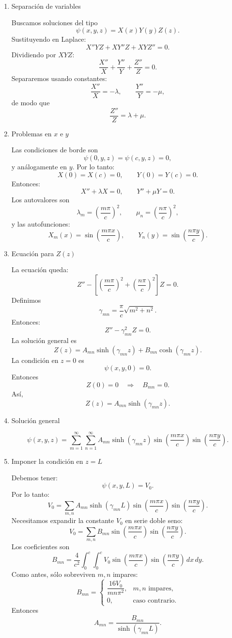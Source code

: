 \documentclass[11pt,spanish]{article}
\begin{document}
\begin{enumerate}
\item Separación de variables

Buscamos soluciones del tipo
$$
\psi(x,y,z)=X(x)Y(y)Z(z).
$$
Sustituyendo en Laplace:
$$
X''YZ+XY''Z+XYZ''=0.
$$
Dividiendo por $XYZ$:
$$
\frac{X''}{X}
+
\frac{Y''}{Y}
+
\frac{Z''}{Z}
=0.
$$
Separaremos usando constantes:
$$
\frac{X''}{X}=-\lambda,
\qquad
\frac{Y''}{Y}=-\mu,
$$
de modo que
$$
\frac{Z''}{Z}=\lambda+\mu.
$$

\item Problemas en $x$ e $y$

Las condiciones de borde son
$$
\psi(0,y,z)=\psi(c,y,z)=0,
$$
y análogamente en $y$. Por lo tanto:
$$
X(0)=X(c)=0,
\qquad
Y(0)=Y(c)=0.
$$
Entonces:
$$
X''+\lambda X=0,
\qquad
Y''+\mu Y=0.
$$
Los autovalores son
$$
\lambda_m=\left(\frac{m\pi}{c}\right)^2,
\qquad
\mu_n=\left(\frac{n\pi}{c}\right)^2,
$$
y las autofunciones:
$$
X_m(x)=\sin\left(\frac{m\pi x}{c}\right),
\qquad
Y_n(y)=\sin\left(\frac{n\pi y}{c}\right).
$$


\item Ecuación para $Z(z)$

La ecuación queda:
$$
Z''-
\left[
\left(\frac{m\pi}{c}\right)^2
+
\left(\frac{n\pi}{c}\right)^2
\right]
Z=0.
$$
Definimos
$$
\gamma_{mn}
=
\frac{\pi}{c}\sqrt{m^2+n^2}.
$$
Entonces:
$$
Z''-\gamma_{mn}^2 Z=0.
$$
La solución general es
$$
Z(z)=
A_{mn}\sinh(\gamma_{mn} z)
+
B_{mn}\cosh(\gamma_{mn} z).
$$
La condición en $z=0$ es
$$
\psi(x,y,0)=0.
$$
Entonces
$$
Z(0)=0
\quad\Rightarrow\quad
B_{mn}=0.
$$
Así,
$$
Z(z)=A_{mn}\sinh(\gamma_{mn} z).
$$

\item Solución general

$$
\psi(x,y,z)=
\sum_{m=1}^{\infty}
\sum_{n=1}^{\infty}
A_{mn}
\sinh(\gamma_{mn} z)
\sin\left(\frac{m\pi x}{c}\right)
\sin\left(\frac{n\pi y}{c}\right).
$$

\item Imponer la condición en $z=L$

Debemos tener:
$$
\psi(x,y,L)=V_0.
$$
Por lo tanto:
$$
V_0=
\sum_{m,n}
A_{mn}
\sinh(\gamma_{mn}L)
\sin\left(\frac{m\pi x}{c}\right)
\sin\left(\frac{n\pi y}{c}\right).
$$
Necesitamos expandir la constante $V_0$ en serie doble seno:
$$
V_0=
\sum_{m,n}
B_{mn}
\sin\left(\frac{m\pi x}{c}\right)
\sin\left(\frac{n\pi y}{c}\right).
$$
Los coeficientes son
$$
B_{mn}
=
\frac{4}{c^2}
\int_0^c\int_0^c
V_0
\sin\left(\frac{m\pi x}{c}\right)
\sin\left(\frac{n\pi y}{c}\right)
\,dx\,dy.
$$
Como antes, sólo sobreviven $m,n$ impares:
$$
B_{mn}
=
\begin{cases}
\dfrac{16V_0}{mn\pi^2},
& m,n \text{ impares}, \\
0,
& \text{caso contrario}.
\end{cases}
$$
Entonces
$$
A_{mn}
=
\frac{B_{mn}}
{\sinh(\gamma_{mn}L)}.
$$


\end{enumerate}
\end{document}
